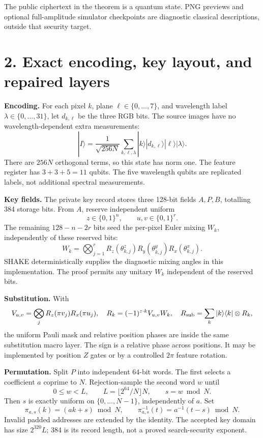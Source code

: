 \documentclass[11pt,a4paper]{article}
\newcommand{\ket}[1]{|#1\rangle}\newcommand{\bra}[1]{\langle#1|}
\begin{document}
The public ciphertext in the theorem is a quantum state. PNG previews and optional full-amplitude simulator checkpoints are diagnostic classical descriptions, outside that security target.

\newpage
\section*{2. Exact encoding, key layout, and repaired layers}
\textbf{Encoding.} For each pixel \(k\), plane \(\ell\in\{0,\ldots,7\}\), and wavelength label \(\lambda\in\{0,\ldots,31\}\), let \(d_{k,\ell}\) be the three RGB bits. The source images have no wavelength-dependent extra measurements:
\[
\ket{I}=\frac1{\sqrt{256N}}\sum_{k,\ell,\lambda}
 \ket{k}\ket{d_{k,\ell}}\ket{\ell}\ket{\lambda}.
\]
There are \(256N\) orthogonal terms, so this state has norm one. The feature register has \(3+3+5=11\) qubits. The five wavelength qubits are replicated labels, not additional spectral measurements.

\textbf{Key fields.} The private key record stores three 128-bit fields \(A,P,B\), totalling 384 storage bits. From \(A\), reserve independent uniform
\[
z\in\{0,1\}^n,\qquad u,v\in\{0,1\}^r.
\]
The remaining \(128-n-2r\) bits seed the per-pixel Euler mixing \(W_k\), independently of these reserved bits:
\[
W_k=\bigotimes_{j=1}^r R_z(\theta^z_{k,j})R_y(\theta^y_{k,j})R_x(\theta^x_{k,j}).
\]
SHAKE deterministically supplies the diagnostic mixing angles in this implementation. The proof permits any unitary \(W_k\) independent of the reserved bits.

\textbf{Substitution.} With
\[
V_{u,v}=\bigotimes_j R_z(\pi v_j)R_x(\pi u_j),
\quad
R_k=(-1)^{z\cdot k}V_{u,v}W_k,
\quad
R_{\rm sub}=\sum_k\ket k\bra k\otimes R_k,
\]
the uniform Pauli mask and relative position phases are inside the same substitution macro layer. The sign is a relative phase across positions. It may be implemented by position \(Z\) gates or by a controlled \(2\pi\) feature rotation.

\textbf{Permutation.} Split \(P\) into independent 64-bit words. The first selects a coefficient \(a\) coprime to \(N\). Rejection-sample the second word \(w\) until
\[
0\le w<L,\qquad L=\lfloor2^{64}/N\rfloor N,
\qquad s=w\bmod N .
\]
Then \(s\) is exactly uniform on \(\{0,\ldots,N-1\}\), independently of \(a\). Set
\[
\pi_{a,s}(k)=(ak+s)\bmod N,\qquad
\pi_{a,s}^{-1}(t)=a^{-1}(t-s)\bmod N.
\]
Invalid padded addresses are extended by the identity. The accepted key domain has size \(2^{320}L\); 384 is its record length, not a proved search-security exponent.
\end{document}

